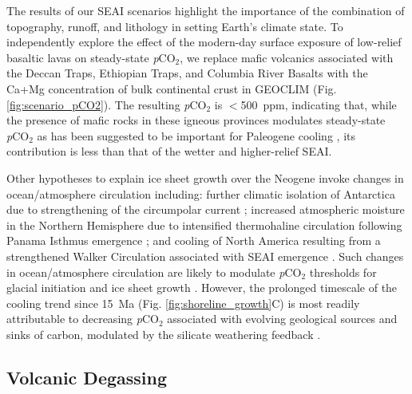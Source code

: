 \documentclass[9pt,twocolumn,twoside,lineno]{pnas-new}
\newcommand{\pCOtwo}{\textit{p}CO$_{2}$\xspace}
\begin{document}
The results of our SEAI scenarios highlight the importance of the combination of topography, runoff, and lithology in setting Earth's climate state. To independently explore the effect of the modern-day surface exposure of low-relief basaltic lavas on steady-state \pCOtwo \cite{Kent2013a}, we replace mafic volcanics associated with the Deccan Traps, Ethiopian Traps, and Columbia River Basalts with the Ca+Mg concentration of bulk continental crust in GEOCLIM (Fig. \ref{fig:scenario_pCO2}). The resulting \pCOtwo is $<$500~ppm, indicating that, while the presence of mafic rocks in these igneous provinces modulates steady-state \pCOtwo as has been suggested to be important for Paleogene cooling \cite{Kent2013a}, its contribution is less than that of the wetter and higher-relief SEAI.

Other hypotheses to explain ice sheet growth over the Neogene invoke changes in ocean/atmosphere circulation including: further climatic isolation of Antarctica due to strengthening of the circumpolar current \cite{Shevenell2004a}; increased atmospheric moisture in the Northern Hemisphere due to intensified thermohaline circulation following Panama Isthmus emergence \cite{Haug1998a}; and cooling of North America resulting from a strengthened Walker Circulation associated with SEAI emergence \cite{Molnar2015a}. Such changes in ocean/atmosphere circulation are likely to modulate \pCOtwo thresholds for glacial initiation and ice sheet growth \cite{DeConto2008a}. However, the prolonged timescale of the cooling trend since 15~Ma (Fig. \ref{fig:shoreline_growth}C) is most readily attributable to decreasing \pCOtwo associated with evolving geological sources and sinks of carbon, modulated by the silicate weathering feedback \cite{Kump1997a}.

\subsection*{Volcanic Degassing}
\end{document}
